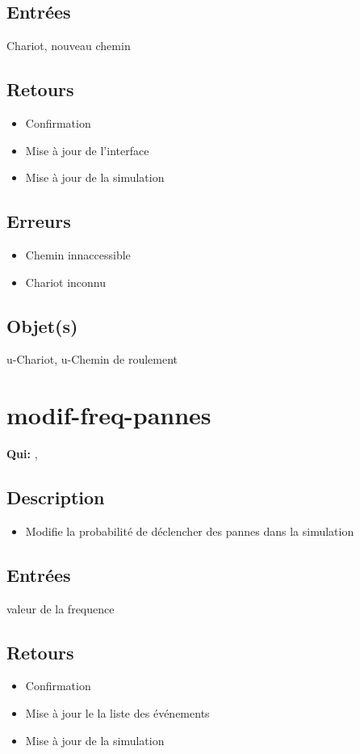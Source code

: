 	\subsection{Entrées}
		Chariot, nouveau chemin

	\subsection{Retours}
	\begin{itemize}
		\item Confirmation
		\item Mise à jour de l'interface
		\item Mise à jour de la simulation
	\end{itemize}

	\subsection{Erreurs}
	\begin{itemize}
		\item Chemin innaccessible \warning
		\item Chariot inconnu \fatal
	\end{itemize}

	\subsection{Objet(s)}
		u-Chariot, u-Chemin de roulement

\section{modif-freq-pannes}
	\textbf{Qui:} \urt, \us 

	\subsection{Description}
	\begin{itemize}
		\item Modifie la probabilité de déclencher des pannes dans la simulation
	\end{itemize}

	\subsection{Entrées}
		valeur de la frequence

	\subsection{Retours}
	\begin{itemize}
		\item Confirmation
		\item Mise à jour le la liste des événements
		\item Mise à jour de la simulation
	\end{itemize}

